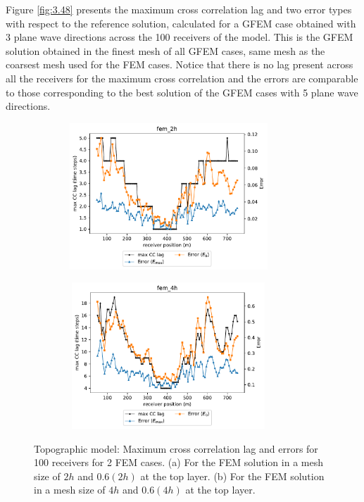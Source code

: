 Figure \ref{fig:3.48} presents the maximum cross correlation lag and two error types with respect to the reference solution, calculated for a GFEM case obtained with 3 plane wave directions across the 100 receivers of the model. This is the GFEM solution obtained in the finest mesh of all GFEM cases, same mesh as the coarsest mesh used for the FEM cases. Notice that there is no lag present across all the receivers for the maximum cross correlation and the errors are comparable to those corresponding to the best solution of the GFEM cases with 5 plane wave directions. 


 \begin{figure}[h!]
 		\centering
		\begin{subfigure}{8cm}
				\includegraphics[width=8cm, height=5.5cm]{Thesis_Edith/figures/topo/topo_waves/Err_fem_2h.pdf}
			     \caption{}
		\end{subfigure}
        \hspace{0.25cm}	
		\begin{subfigure}{8cm}
				\includegraphics[width=8cm, height=5.5cm]{Thesis_Edith/figures/topo/topo_waves/Err_fem_4h.pdf}
			   \caption{}
		\end{subfigure}
 
	\caption{Topographic model: Maximum cross correlation lag and errors for 100 receivers for 2 FEM cases. (a) For the FEM solution in a mesh size of $2h$ and $0.6 (2h)$ at the top layer. (b) For the FEM solution in a mesh size of $4h$ and $0.6 (4h)$ at the top layer. }
	\label{fig:3.45}
\end{figure}




